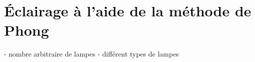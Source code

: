 \section{Éclairage à l'aide de la méthode de Phong}

- nombre arbitraire de lampes
- différent types de lampes

